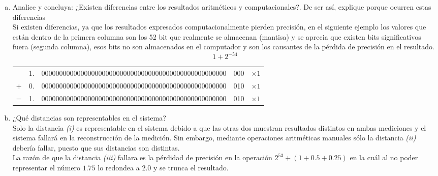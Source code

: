 \documentclass[10pt]{article}
\begin{document}
\begin{enumerate}[a)]
\item Analice y concluya: ¿Existen diferencias entre los resultados aritméticos y computacionales?. De ser así, explique porque ocurren estas diferencias \\
Si existen diferencias, ya que los resultados expresados computacionalmente pierden precisión, en el siguiente ejemplo los valores que están dentro de la primera columna son los 52 bit que realmente se almacenan (mantisa) y se aprecia que existen bits significativos fuera (segunda columna),  esos bits no son almacenados en el computador y son los causantes de la pérdida de precisión en el resultado.
$$1 + 2^{-54}$$
\begin{center}
\begin{tabular}{c c | c | c | c}
 \cline{3-4}
 & 1. & 0000000000000000000000000000000000000000000000000000 & 000 & $\times 1$\\
 \cline{3-4}
 + & 0. & 0000000000000000000000000000000000000000000000000000 & 010 & $\times 1$\\
 \cline{1-5}
 = & 1. & 0000000000000000000000000000000000000000000000000000 & 010 & $\times 1$\\
 \cline{3-4}
\end{tabular}
\end{center}

\item ¿Qué distancias son representables en el sistema? \\
Solo la distancia \textit{(i)} es representable en el sistema debido a que las otras dos muestran resultados distintos en ambas mediciones y el sistema fallará en la reconstrucción de la medición. Sin embargo, mediante operaciones aritméticas manuales sólo la distancia \textit{(ii)} debería fallar, puesto que sus distancias son distintas. \\
La razón de que la distancia \textit{(iii)} fallara es la pérdidad de precisión en la operación $2^{53} + (1 + 0.5 + 0.25)$ en la cuál al no poder representar el número $1.75$ lo redondea a $2.0$ y se trunca el resultado.

\end{enumerate}
\end{document}
